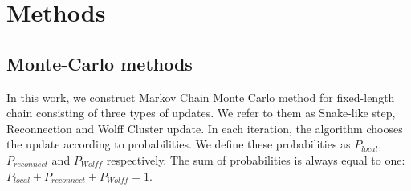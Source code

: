 \chapter{Methods} \label{ch:method}



\section{Monte-Carlo methods}




In this work, we construct Markov Chain Monte Carlo method for fixed-length chain consisting of three types of updates. We refer to them as Snake-like step, Reconnection and Wolff Cluster update. In each iteration, the algorithm chooses the update according to probabilities. We define these probabilities as $P_{local}$,$P_{reconnect}$ and $P_{Wolff}$ respectively. The sum of probabilities is always equal to one: $P_{local} + P_{reconnect} + P_{Wolff} = 1$. 